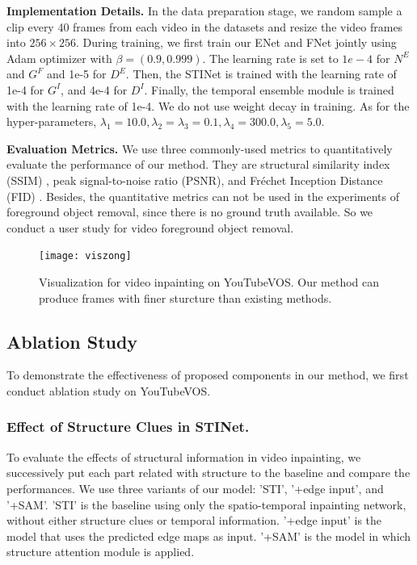 	
\noindent \textbf{Implementation Details.} 
In the data preparation stage, we random sample a clip every 40 frames from each video in the datasets and resize the video frames into $256\times256$.
%
During training, we first train our ENet and FNet jointly using Adam optimizer with $\beta=(0.9, 0.999)$.
The learning rate is set to $1e-4$ for $N^E$ and $G^F$ and 1e-5 for $D^E$. Then, the STINet is trained with the learning rate of 1e-4 for $G^I$, and 4e-4 for $D^I$. Finally, the temporal ensemble module is trained with the learning rate of 1e-4.  We do not use weight decay in training.
As for the hyper-parameters, $\lambda_1=10.0,\lambda_2=\lambda_3=0.1,\lambda_4=300.0,\lambda_5=5.0$.

\noindent \textbf{Evaluation Metrics.} 
We use three commonly-used metrics to quantitatively evaluate the performance of our method. They are structural similarity index (SSIM) \cite{wang2004image}, peak signal-to-noise ratio (PSNR), and Fr{\'e}chet Inception Distance (FID) \cite{heusel2017gans}. 
Besides, the quantitative metrics can not be used in the experiments of foreground object removal, since there is no ground truth available. So we conduct a user study for video foreground object removal. 
%




\begin{figure}[t]
	\centering
	\texttt{[image: viszong]} %
	\caption{Visualization for video inpainting on YouTubeVOS. Our method can produce frames with finer sturcture than existing methods. }
	\label{viszong}
\end{figure}

\subsection{Ablation Study}
To demonstrate the effectiveness of proposed components in our method, we first conduct ablation study on YouTubeVOS. 

\subsubsection{Effect of Structure Clues in STINet.}

To evaluate the effects of structural information in video inpainting, we successively put each part related with structure to the baseline and compare the performances. We use three variants of our model: 'STI', '+edge input', and '+SAM'. 
'STI' is the baseline using only the spatio-temporal inpainting network, without either structure clues or temporal information. '+edge input' is the model that uses the predicted edge maps as input. '+SAM' is the model in which structure attention module is applied.

